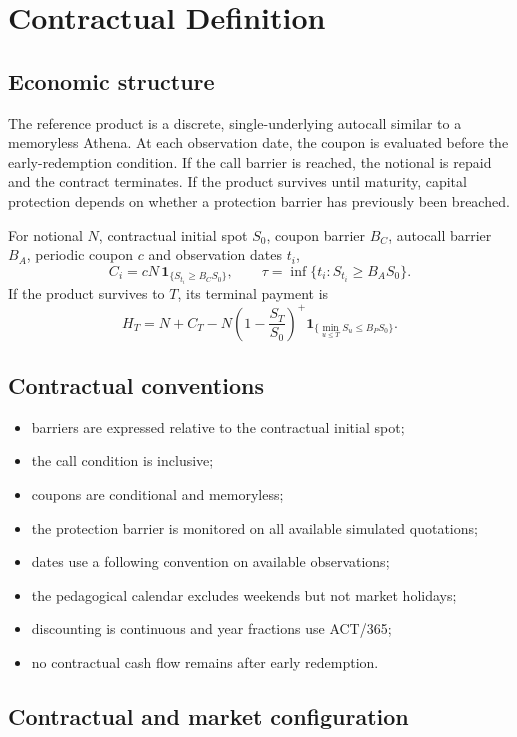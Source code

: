 \documentclass[11pt,a4paper]{article}
\begin{document}
\section{Contractual Definition}

\subsection{Economic structure}

The reference product is a discrete, single-underlying autocall similar to a memoryless Athena. At each observation date, the coupon is evaluated before the early-redemption condition. If the call barrier is reached, the notional is repaid and the contract terminates. If the product survives until maturity, capital protection depends on whether a protection barrier has previously been breached.

For notional $N$, contractual initial spot $S_0$, coupon barrier $B_C$, autocall barrier $B_A$, periodic coupon $c$ and observation dates $t_i$,
\[
C_i=cN\,\mathbf{1}_{\{S_{t_i}\geq B_CS_0\}},
\qquad
\tau=\inf\{t_i:S_{t_i}\geq B_AS_0\}.
\]
If the product survives to $T$, its terminal payment is
\[
H_T=N+C_T-N\left(1-\frac{S_T}{S_0}\right)^+
\mathbf{1}_{\{\min_{u\leq T}S_u\leq B_PS_0\}}.
\]

\subsection{Contractual conventions}

\begin{itemize}
\item barriers are expressed relative to the contractual initial spot;
\item the call condition is inclusive;
\item coupons are conditional and memoryless;
\item the protection barrier is monitored on all available simulated quotations;
\item dates use a following convention on available observations;
\item the pedagogical calendar excludes weekends but not market holidays;
\item discounting is continuous and year fractions use ACT/365;
\item no contractual cash flow remains after early redemption.
\end{itemize}

\subsection{Contractual and market configuration}
\end{document}
